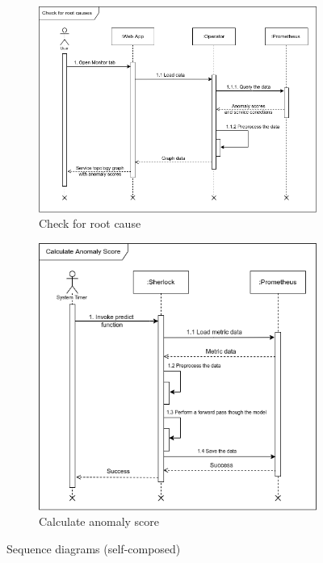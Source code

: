 \begin{figure}[H]
    \centering
    \begin{subfigure}[b]{0.70\textwidth}
        \centering
        \includegraphics[width=\textwidth]{assets/system-design/sequence-diagram-1.png}
        \caption{Check for root cause}
    \end{subfigure}
    \hfill
    \begin{subfigure}[b]{0.70\textwidth}
        \centering
        \includegraphics[width=\textwidth]{assets/system-design/sequence-diagram-2.png}
        \caption{Calculate anomaly score}
    \end{subfigure}
    \hfill
       \caption{Sequence diagrams (self-composed)}
\end{figure}

